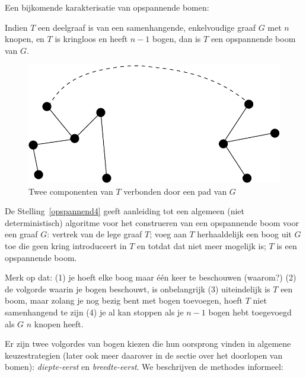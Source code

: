 Een bijkomende karakterisatie van opspannende bomen:

\begin{eig}
Indien $T$ een deelgraaf is van een samenhangende, enkelvoudige graaf $G$ met 
$n$
knopen, en $T$ is kringloos en heeft $n-1$ bogen, dan is $T$ een
opspannende boom van $G$.
\end{eig}

\begin{figure}[ht]
\begin{center}
\includegraphics[width=0.3\linewidth,keepaspectratio]{opspannend3}
\end{center}
\caption{Twee componenten van $T$ verbonden door een pad van $G$
\label{opspannend3}}
\end{figure}

De Stelling~\ref{opspannend4} geeft aanleiding tot een algemeen
(niet deterministisch)
algoritme voor het construeren van een opspannende boom voor een graaf
$G$: vertrek van de lege graaf $T$; voeg aan $T$ herhaaldelijk een boog uit
$G$ toe die geen kring introduceert in $T$ en totdat dat niet meer
mogelijk is; $T$ is een opspannende boom.

Merk op dat: (1) je hoeft elke
boog maar \'{e}\'{e}n keer te beschouwen (waarom?) (2) de volgorde
waarin je bogen beschouwt, is onbelangrijk (3) uiteindelijk is $T$ een
boom, maar zolang je nog bezig bent met bogen toevoegen, hoeft $T$
niet samenhangend te zijn (4) je al kan stoppen als je $n-1$ bogen
hebt toegevoegd als $G$ $n$ knopen heeft.

Er zijn twee volgordes van bogen
kiezen die hun oorsprong vinden in algemene keuzestrategien (later ook
meer daarover in de sectie over het doorlopen van bomen): {\em
diepte-eerst} en {\em breedte-eerst}. We beschrijven de methodes
informeel:

